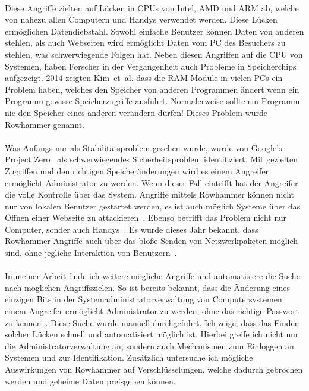 \documentclass[a4paper]{article}
\newcommand{\etal}{et~al. }
\begin{document}
\paragraph{}

Diese Angriffe zielten auf Lücken in CPUs von Intel, AMD und ARM ab, welche
von nahezu allen Computern und Handys verwendet werden. Diese Lücken
ermöglichen Datendiebstahl. Sowohl einfache Benutzer können Daten von anderen
stehlen, als auch Webseiten wird ermöglicht Daten vom PC des Besuchers zu
stehlen, was schwerwiegende Folgen hat. Neben diesen Angriffen auf die CPU
von Systemen, haben Forscher in der Vergangenheit auch Probleme in
Speicherchips aufgezeigt. 2014 zeigten Kim~\etal\cite{rowhammergeneral} dass
die RAM Module in vielen PCs ein Problem haben, welches den Speicher von anderen
Programmen ändert wenn ein Programm gewisse Speicherzugriffe ausführt.
Normalerweise sollte ein Programm nie den Speicher eines anderen verändern
dürfen! Dieses Problem wurde Rowhammer genannt.

\paragraph{}

Was Anfangs nur als Stabilitätsproblem gesehen wurde, wurde von Google's Project
Zero~\cite{projectzerorow} als schwerwiegendes Sicherheitsproblem identifiziert.
Mit gezielten Zugriffen und den richtigen Speicheränderungen wird es einem
Angreifer ermöglicht Administrator zu werden. Wenn dieser Fall eintrifft hat
der Angreifer die volle Kontrolle über das System. Angriffe mittels Rowhammer
können nicht nur von lokalen Benutzer gestartet werden, es ist auch möglich
Systeme über das Öffnen einer Webseite zu attackieren~\cite{rowhammerjs}.
Ebenso betrifft das Problem nicht nur Computer, sonder auch
Handys~\cite{drammer}. Es wurde dieses Jahr bekannt, dass Rowhammer-Angriffe
auch über das bloße Senden von Netzwerkpaketen möglich sind, ohne jegliche
Interaktion von Benutzern~\cite{nethammer}.

\paragraph{}

In meiner Arbeit finde ich weitere mögliche Angriffe und automatisiere die Suche
nach möglichen Angriffszielen. So ist bereits bekannt, dass die Änderung
eines einzigen Bits in der Systemadministratorverwaltung von Computersystemen
einem Angreifer ermöglicht Administrator zu werden, ohne das
richtige Passwort zu kennen~\cite{flipinthewall}. Diese Suche wurde manuell
durchgeführt. Ich zeige, dass das Finden solcher Lücken schnell und
automatisiert möglich ist. Hierbei greife ich nicht nur die
Administratorverwaltung an, sondern auch Mechanismen zum Einloggen an Systemen
und zur Identifikation. Zusätzlich untersuche ich mögliche Auswirkungen von
Rowhammer auf Verschlüsselungen, welche dadurch gebrochen werden und geheime
Daten preisgeben können.
\end{document}
